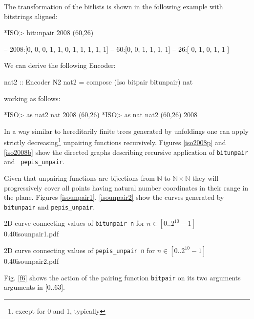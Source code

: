 \documentclass[]{INCLUDES/llncs}
\begin{document}
The transformation of the bitlists
is shown in the following example 
with bitstrings aligned:
\begin{codex}
*ISO> bitunpair 2008
  (60,26)

-- 2008:[0, 0, 0, 1, 1, 0, 1, 1, 1, 1, 1]
--   60:[0,    0,    1,    1,    1,    1]
--   26:[   0,    1,    0,    1,    1   ]
\end{codex}

We can derive the following Encoder:
\begin{code}
nat2 :: Encoder N2
nat2 = compose (Iso bitpair bitunpair) nat
\end{code}
working as follows:
\begin{codex}
*ISO> as nat2 nat 2008
(60,26)
*ISO> as nat nat2 (60,26)
2008
\end{codex}

In a way similar to hereditarily finite trees generated by unfoldings one can
apply strictly decreasing\footnote{except for 0 and 1, typically} unpairing
functions recursively. Figures \ref{iso2008p} and \ref{iso2008b} show the
directed graphs describing recursive application of {\tt bitunpair} and {\tt
pepis\_unpair}.



Given that unpairing functions are bijections from $\mathbb{N}$ to $\mathbb{N} \times \mathbb{N}$
they will progressively cover all points having natural number coordinates in
their range in the plane. Figures \ref{isounpair1}, \ref{isounpair2} 
show the curves generated by {\tt bitunpair} and {\tt pepis\_unpair}.

{2D curve connecting values of {\tt bitunpair n} for $n \in [0..2^{10}-1]$}
{0.40}{isounpair1.pdf}

{2D curve connecting values of {\tt pepis\_unpair n} for $n \in [0..2^{10}-1]$}
{0.40}{isounpair2.pdf}

Fig. \ref{f6} shows the action of the pairing function {\tt bitpair}
on its two arguments arguments in [0..63].

\end{document}
